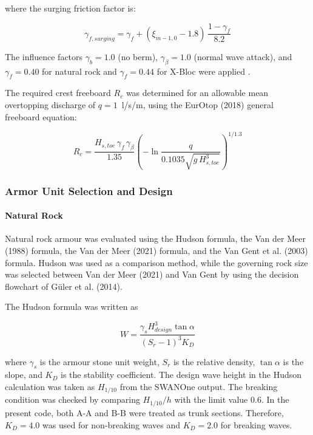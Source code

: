 \documentclass[a4paper, 11pt]{article}
\newcommand{\subsubsubsection}[1]{\paragraph{#1}\mbox{}}
\begin{document}
where the surging friction factor is:

\begin{equation}
    \gamma_{f,surging} = \gamma_f + 
    (\xi_{m-1,0} - 1.8)\,\frac{1 - \gamma_f}{8.2}
\end{equation}

The influence factors $\gamma_b = 1.0$ (no berm), 
$\gamma_\beta = 1.0$ (normal wave attack), and $\gamma_f = 0.40$ 
for natural rock and $\gamma_f = 0.44$ for X-Bloc were applied 
\cite{EurOtop2018}.

The required crest freeboard $R_c$ was determined for an allowable 
mean overtopping discharge of $q = 1$~l/s/m, using the EurOtop 
(2018) general freeboard equation:

\begin{equation}
    R_c = \frac{H_{s,toe}\,\gamma_f\,\gamma_\beta}{1.35}
    \left(-\ln\frac{q}{0.1035\sqrt{g\,H_{s,toe}^3}}\right)^{1/1.3}
\end{equation}


\subsubsection{Armor Unit Selection and Design}

\subsubsubsection{Natural Rock}

\hspace*{0.5cm} Natural rock armour was evaluated using the Hudson formula, the Van der Meer (1988) formula, the Van der Meer (2021) formula, and the Van Gent et al. (2003) formula. Hudson was used as a comparison method, while the governing rock size was selected between Van der Meer (2021) and Van Gent by using the decision flowchart of G\"uler et al. (2014).

The Hudson formula was written as

\begin{equation}
    W=
    \frac{\gamma_s H_{design}^{3}\tan\alpha}
    {(S_r-1)^3K_D}
\end{equation}

where \(\gamma_s\) is the armour stone unit weight, \(S_r\) is the relative density, \(\tan\alpha\) is the slope, and \(K_D\) is the stability coefficient. The design wave height in the Hudson calculation was taken as \(H_{1/10}\) from the SWANOne output. The breaking condition was checked by comparing \(H_{1/10}/h\) with the limit value 0.6. In the present code, both A-A and B-B were treated as trunk sections. Therefore, \(K_D=4.0\) was used for non-breaking waves and \(K_D=2.0\) for breaking waves.
\end{document}
